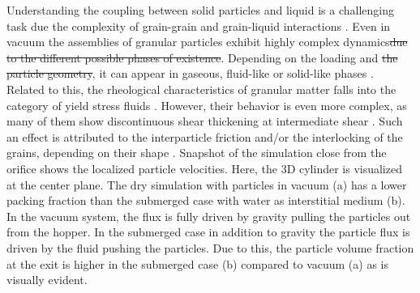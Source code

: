 \documentclass[twoside,twocolumn,9pt]{article}
\providecommand{\DIFadd}[1]{{\protect\color{blue}\uwave{#1}}} %
\providecommand{\DIFdel}[1]{{\protect\color{red}\sout{#1}}}                      %
\providecommand{\DIFaddbegin}{} %
\providecommand{\DIFaddend}{} %
\providecommand{\DIFdelbegin}{} %
\providecommand{\DIFdelend}{} %
\newcommand{\DIFscaledelfig}{0.5}
\newlength{\DIFdelgraphicswidth} %
\newlength{\DIFdelgraphicsheight} %
\newcommand{\DIFaddincludegraphics}[2][]{{\color{blue}\fbox{\DIFOincludegraphics[#1]{#2}}}} %
\newcommand{\DIFdelincludegraphics}[2][]{%
\sbox{\DIFdelgraphicsbox}{\DIFOincludegraphics[#1]{#2}}%
\settoboxwidth{\DIFdelgraphicswidth}{\DIFdelgraphicsbox} %
\settoboxtotalheight{\DIFdelgraphicsheight}{\DIFdelgraphicsbox} %
\scalebox{\DIFscaledelfig}{%
\parbox[b]{\DIFdelgraphicswidth}{\usebox{\DIFdelgraphicsbox}\\[-\baselineskip] \rule{\DIFdelgraphicswidth}{0em}}\llap{\resizebox{\DIFdelgraphicswidth}{\DIFdelgraphicsheight}{%
\setlength{\unitlength}{\DIFdelgraphicswidth}%
\begin{picture}(1,1)%
\thicklines\linethickness{2pt} %
{\color[rgb]{1,0,0}\put(0,0){\framebox(1,1){}}}%
{\color[rgb]{1,0,0}\put(0,0){\line( 1,1){1}}}%
{\color[rgb]{1,0,0}\put(0,1){\line(1,-1){1}}}%
\end{picture}%
}\hspace*{3pt}}} %
} %
\DeclareRobustCommand{\DIFaddbegin}{\DIFOaddbegin \let\includegraphics\DIFaddincludegraphics} %
\DeclareRobustCommand{\DIFaddend}{\DIFOaddend \let\includegraphics\DIFOincludegraphics} %
\DeclareRobustCommand{\DIFdelbegin}{\DIFOdelbegin \let\includegraphics\DIFdelincludegraphics} %
\DeclareRobustCommand{\DIFdelend}{\DIFOaddend \let\includegraphics\DIFOincludegraphics} %
\begin{document}
Understanding the coupling between solid particles and liquid is a challenging task due the complexity of grain-grain and grain-liquid interactions \cite{zhou2010discrete,zhu2007discrete}. Even in vacuum the assemblies of granular particles exhibit highly complex dynamics\DIFdelbegin \DIFdel{due to the different possible phases of existence}\DIFdelend . Depending on the loading and \DIFdelbegin \DIFdel{the particle geometry}\DIFdelend \DIFaddbegin \DIFadd{density}\DIFaddend , it can appear in gaseous, fluid-like or solid-like phases \cite{Eshuis2007}. Related to this, the rheological characteristics of granular matter falls into the category of yield stress fluids \cite{Divoux2015,Johnson2017}. However, their behavior is even more complex, as many of them show discontinuous shear thickening at intermediate shear \cite{Seto2013}. Such an effect is attributed to the interparticle friction and/or the interlocking of the grains, depending on their shape \cite{LosertPRE00,Athanassiadis2014, Jaeger2014}.
\DIFdelbegin %
Snapshot of the simulation close from the orifice shows the localized particle velocities. Here, the 3D cylinder is visualized at the center plane. The dry simulation with particles in vacuum (a) has a lower packing fraction than the submerged case with water as interstitial medium (b). In the vacuum system, the flux is fully driven by gravity pulling the particles out from the hopper. In the submerged case in addition to gravity the particle flux is driven by the fluid pushing the particles. Due to this, the particle volume fraction at the exit is higher in the submerged case (b) compared to vacuum (a) as is visually evident.
\DIFdelend 
\end{document}
